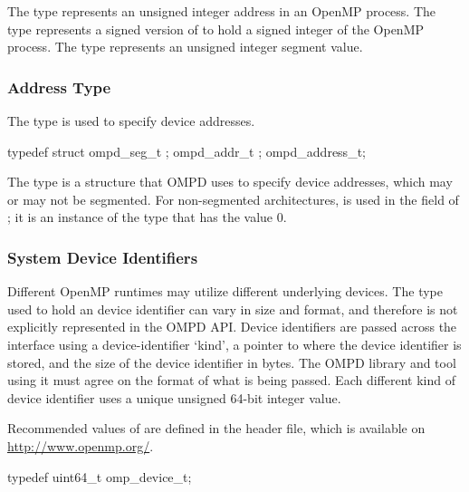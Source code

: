 \descr
The  type represents an unsigned integer address in an
OpenMP process.
The  type represents a signed version of   to hold a signed
integer of the OpenMP process.
The  type represents an unsigned integer segment value.



\subsubsection{Address Type}
\label{subsubsubsec:ompd_address_t}

\summary
The  type is used to specify device addresses.

\format
\begin{ccppspecific}
\begin{ompEnv}
typedef struct {
  ompd_seg_t ;
  ompd_addr_t ;
} ompd_address_t;
\end{ompEnv}
\end{ccppspecific}

\descr
The  type is a structure that OMPD uses to specify 
device addresses, which may or may not be segmented. For non-segmented 
architectures,  is used in the  
field of ; it is an instance of the  
type that has the value 0.



\subsubsection{System Device Identifiers}

\summary
Different OpenMP runtimes may utilize different underlying devices.
The type used to hold an device identifier can vary in size and format, and
therefore is not explicitly represented in the OMPD API. Device identifiers are
passed across the interface using a device-identifier `kind', a pointer to where
the device identifier is stored, and the size of the device identifier in bytes.
The OMPD library and tool using it must agree on the format
of what is being passed.
Each different kind of device identifier uses a unique
unsigned 64-bit integer value.

Recommended values of  are defined in the 
header file, which is available on \url{http://www.openmp.org/}.

\label{ompd:omp_device_t}
\format
\begin{ccppspecific}
\begin{ompSyntax}
typedef uint64_t omp_device_t;
\end{ompSyntax}
\end{ccppspecific}



